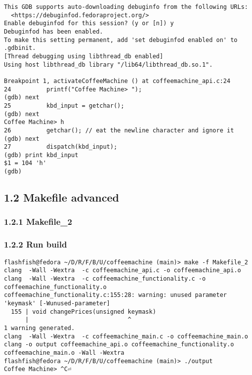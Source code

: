 \documentclass{report}
\begin{document}
\begin{lstlisting}[style=cppstyle, title=\texttt{Terminal Output}]
This GDB supports auto-downloading debuginfo from the following URLs:
  <https://debuginfod.fedoraproject.org/>
Enable debuginfod for this session? (y or [n]) y
Debuginfod has been enabled.
To make this setting permanent, add 'set debuginfod enabled on' to .gdbinit.
[Thread debugging using libthread_db enabled]
Using host libthread_db library "/lib64/libthread_db.so.1".

Breakpoint 1, activateCoffeeMachine () at coffeemachine_api.c:24
24          printf("Coffee Machine> ");
(gdb) next
25          kbd_input = getchar();
(gdb) next
Coffee Machine> h
26          getchar(); // eat the newline character and ignore it
(gdb) next
27          dispatch(kbd_input);
(gdb) print kbd_input
$1 = 104 'h'
(gdb)
\end{lstlisting}




\subsection*{1.2 Makefile advanced}

\subsubsection*{1.2.1 Makefile\_2}



\subsubsection*{1.2.2 Run build}

\begin{lstlisting}[style=cppstyle, title=\texttt{Terminal Output}]
flashfish@fedora ~/D/R/F/B/U/coffeemachine (main)> make -f Makefile_2
clang  -Wall -Wextra  -c coffeemachine_api.c -o coffeemachine_api.o
clang  -Wall -Wextra  -c coffeemachine_functionality.c -o coffeemachine_functionality.o
coffeemachine_functionality.c:155:28: warning: unused parameter 'keymask' [-Wunused-parameter]
  155 | void changePrices(unsigned keymask)
      |                            ^
1 warning generated.
clang  -Wall -Wextra  -c coffeemachine_main.c -o coffeemachine_main.o
clang -o output coffeemachine_api.o coffeemachine_functionality.o coffeemachine_main.o -Wall -Wextra
flashfish@fedora ~/D/R/F/B/U/coffeemachine (main)> ./output
Coffee Machine> ^C⏎
\end{lstlisting}
\end{document}
